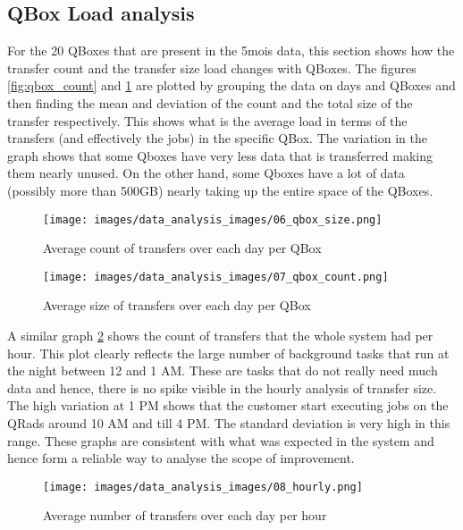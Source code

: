 \subsection{QBox Load analysis}

For the 20 QBoxes that are present in the 5mois data, this section shows how the transfer count and the transfer size load changes with QBoxes. The figures \ref{fig:qbox_count} and \ref{fig:qbox_size} are plotted by grouping the data on days and QBoxes and then finding the mean and deviation of the count and the total size of the transfer respectively. This shows what is the average load in terms of the transfers (and effectively the jobs) in the specific QBox. The variation in the graph shows that some Qboxes have very less data that is transferred making them nearly unused. On the other hand, some Qboxes have a lot of data (possibly more than 500GB) nearly taking up the entire space of the QBoxes.

\begin{figure}[H]
  \begin{minipage}[b]{0.5\linewidth}
    \centering
    \texttt{[image: images/data\_analysis\_images/06\_qbox\_size.png]}
    \caption{Average count of transfers over each day per QBox}
    \label{fig:qbox_count}
  \end{minipage}
  \hspace{0.5cm}
  \begin{minipage}[b]{0.5\linewidth}
    \centering
    \texttt{[image: images/data\_analysis\_images/07\_qbox\_count.png]}
    \caption{Average size of transfers over each day per QBox}
    \label{fig:qbox_size}
  \end{minipage}
\end{figure}

A similar graph \ref{fig:hourly} shows the count of transfers that the whole system had per hour. This plot clearly reflects the large number of background tasks that run at the night between 12 and 1 AM. These are tasks that do not really need much data and hence, there is no spike visible in the hourly analysis of transfer size. The high variation at 1 PM shows that the customer start executing jobs on the QRads around 10 AM and till 4 PM. The standard deviation is very high in this range. These graphs are consistent with what was expected in the system and hence form a reliable way to analyse the scope of improvement.

\begin{figure}[ht]
    \centering
    \texttt{[image: images/data\_analysis\_images/08\_hourly.png]}
    \caption{Average number of transfers over each day per hour}
    \label{fig:hourly}
\end{figure}

